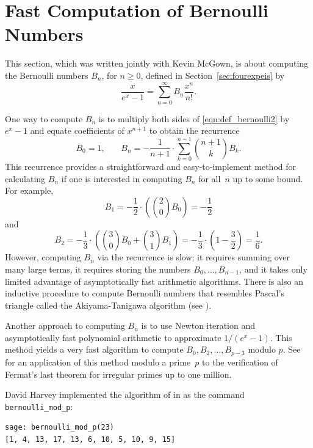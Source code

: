 \section{Fast Computation of Bernoulli Numbers}
\label{sec:bercomp}
This section, which was written jointly with Kevin McGown,
is about computing the 
Bernoulli numbers $B_n$, for $n\geq 0$, defined 
in Section~\ref{sec:fourexpeis} by
\begin{equation}\label{eqn:def_bernoulli2}
  \frac{x}{e^x - 1} = \sum_{n=0}^{\infty} B_n \frac{x^n}{n!}.
\end{equation}

One way to compute $B_n$ is to
multiply both sides of \eqref{eqn:def_bernoulli2}
by $e^x-1$ and equate
coefficients of $x^{n+1}$ to obtain the
recurrence
$$
  B_0=1\text{,}
  \qquad
  B_n=-\frac{1}{n+1}\cdot \sum_{k=0}^{n-1}\binom{n+1}{k}B_{k}.
$$
This recurrence provides a straightforward and easy-to-implement
method for calculating $B_n$ if one is interested in
computing $B_n$ for all~$n$ up to some bound.
For example,
$$
 B_1 = - \frac{1}{2} \cdot \left( \binom{2}{0} B_0\right) = -\frac{1}{2}
$$
and
$$
 B_2 = -\frac{1}{3} \cdot \left( \binom{3}{0} B_0 + \binom{3}{1} B_1  \right)
   = -\frac{1}{3} \cdot \left( 1 - \frac{3}{2}\right) = \frac{1}{6}.
$$
However, computing $B_n$ via the recurrence is slow; it requires
summing over many large terms, it requires storing the numbers
$B_0,\dots,B_{n-1}$, and it takes only limited advantage of
asymptotically fast arithmetic algorithms.  There is also an inductive
procedure to compute Bernoulli numbers that resembles Pascal's
triangle called the Akiyama-Tanigawa algorithm (see
\cite{akiyama-tanigawa}).

Another approach to computing $B_n$ is to use Newton
iteration and asymptotically fast polynomial arithmetic to approximate
$1/(e^x -1)$.  This method yields a very fast algorithm to compute
$B_0, B_2,\ldots, B_{p-3}$ modulo $p$.  
See \cite{buhler:million} for an application of this
method modulo a prime~$p$ to the verification of
Fermat's last theorem for irregular primes up to one million.  
\begin{example}
David Harvey implemented the algorithm of \cite{buhler:million}  
in \sage{} as the command {\tt bernoulli\_mod\_p}:
\begin{verbatim}
sage: bernoulli_mod_p(23)
[1, 4, 13, 17, 13, 6, 10, 5, 10, 9, 15]
\end{verbatim}
\end{example}

